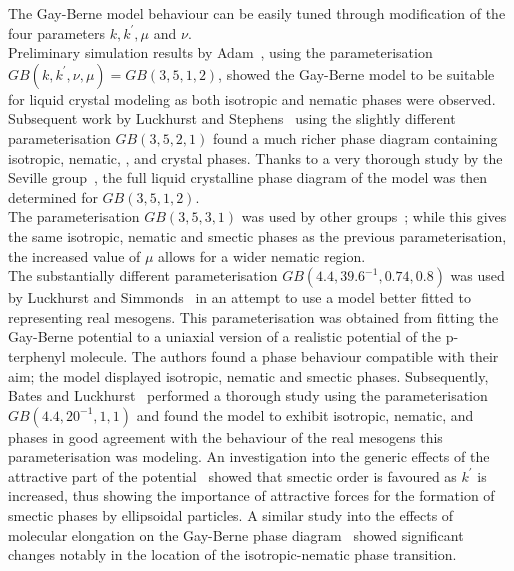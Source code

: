 The Gay-Berne model behaviour can be easily tuned through modification of the four parameters
$k,k^\prime,\mu$ and $\nu$.\\
Preliminary simulation results by Adam~\etal\cite{AdamLuckhurst87}, using the parameterisation 
$GB(k,k^\prime,\nu,\mu) = GB(3,5,1,2)$, showed the Gay-Berne model
to be suitable for liquid crystal modeling as both isotropic and nematic phases were observed.
Subsequent work by Luckhurst and Stephens~\cite{LuckhurstStephens90} using the slightly
different parameterisation $GB(3,5,2,1)$ found a much richer phase diagram containing isotropic,
nematic, \smA, \smB and crystal phases. Thanks to a very thorough study by the 
Seville group~\cite{ChalamGubbins91,deMiguelRull91,deMiguelRull91a},
the full liquid crystalline phase diagram of the model was then determined for
$GB(3,5,1,2)$.\\
%
The parameterisation $GB(3,5,3,1)$ was used by other groups~\cite{BerardiEmerson93,
AllenWarren96}; while this gives the same isotropic, nematic and smectic phases as the
previous parameterisation, the increased value of $\mu$ allows for a wider nematic region.\\
%
The substantially different parameterisation $GB(4.4, 39.6^{-1}, 0.74, 0.8)$ was used by Luckhurst
and Simmonds~\cite{LuckhurstSimmonds93} in an attempt to use a model better fitted to
representing
real mesogens. This parameterisation was obtained from fitting the Gay-Berne potential to a uniaxial
version of a realistic potential of the p-terphenyl molecule. The authors found a phase behaviour
compatible with their aim; the model displayed isotropic, nematic and smectic phases.
Subsequently, Bates and Luckhurst~\cite{BatesLuckhurst99} performed a thorough study using 
the parameterisation  $GB(4.4,20^{-1},1,1)$ and found the model to exhibit isotropic, nematic, \smA
and \smB phases in good agreement with the behaviour of the real mesogens this parameterisation was
modeling.
%
An investigation into the generic effects of the attractive part of the 
potential~\cite{deMiguelDelRio96} showed that
smectic order is favoured as $k^\prime$ is increased, thus showing the importance of attractive
forces for the formation of smectic phases by ellipsoidal particles. A similar study into the
effects of molecular elongation on the Gay-Berne phase diagram~\cite{BrownAllen98} showed significant
changes notably in the location of the isotropic-nematic phase transition.\\

